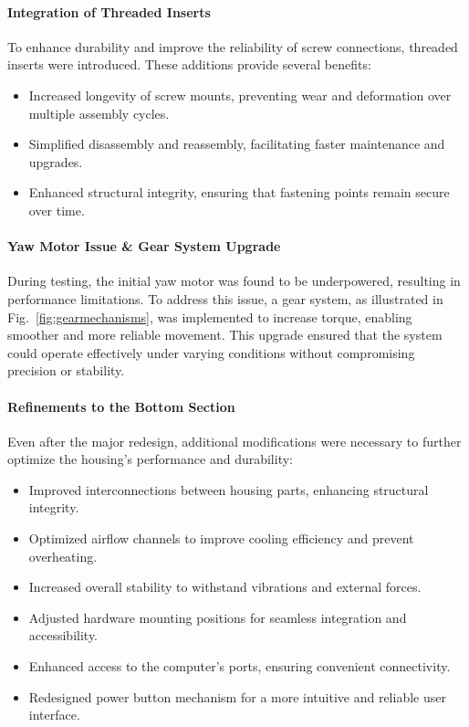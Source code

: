 \paragraph{Integration of Threaded Inserts}  
To enhance durability and improve the reliability of screw connections, threaded inserts were introduced. These additions provide several benefits:  
\begin{itemize}  
	\item Increased longevity of screw mounts, preventing wear and deformation over multiple assembly cycles.  
	\item Simplified disassembly and reassembly, facilitating faster maintenance and upgrades.  
	\item Enhanced structural integrity, ensuring that fastening points remain secure over time.  
\end{itemize}  

\paragraph{Yaw Motor Issue \& Gear System Upgrade}  
During testing, the initial yaw motor was found to be underpowered, resulting in performance limitations. To address this issue, a gear system, as illustrated in Fig.~\ref{fig:gearmechanisms}, was implemented to increase torque, enabling smoother and more reliable movement. This upgrade ensured that the system could operate effectively under varying conditions without compromising precision or stability.  

\paragraph{Refinements to the Bottom Section}  
Even after the major redesign, additional modifications were necessary to further optimize the housing’s performance and durability:  
\begin{itemize}  
	\item Improved interconnections between housing parts, enhancing structural integrity.  
	\item Optimized airflow channels to improve cooling efficiency and prevent overheating.  
	\item Increased overall stability to withstand vibrations and external forces.  
	\item Adjusted hardware mounting positions for seamless integration and accessibility.  
	\item Enhanced access to the computer’s ports, ensuring convenient connectivity.  
	\item Redesigned power button mechanism for a more intuitive and reliable user interface.  
\end{itemize}  

